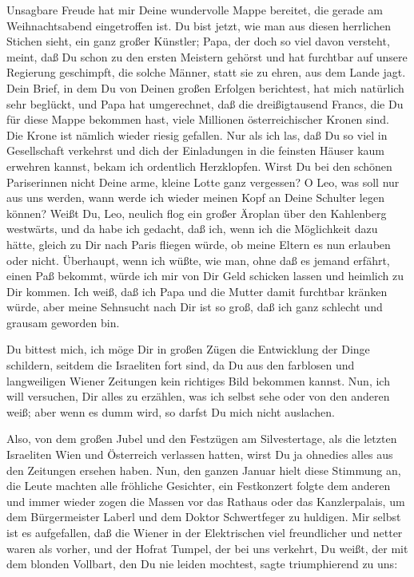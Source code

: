 Unsagbare Freude hat mir Deine wundervolle Mappe bereitet, die
gerade am Weihnachtsabend eingetroffen ist. Du bist jetzt, wie man
aus diesen herrlichen Stichen sieht, ein ganz großer Künstler;
Papa, der doch so viel davon versteht, meint, daß Du schon zu den
ersten Meistern gehörst und hat furchtbar auf unsere Regierung
geschimpft, die solche Männer, statt sie zu ehren, aus dem Lande
jagt.  Dein Brief, in dem Du von Deinen großen
Erfolgen berichtest, hat mich natürlich sehr beglückt, und Papa hat
umgerechnet, daß die dreißigtausend Francs, die Du für diese Mappe
bekommen hast, viele Millionen österreichischer Kronen sind. Die
Krone ist nämlich wieder riesig gefallen. Nur als ich las, daß Du
so viel in Gesellschaft verkehrst und dich der Einladungen in die
feinsten Häuser kaum erwehren kannst, bekam ich ordentlich
Herzklopfen. Wirst Du bei den schönen Pariserinnen nicht Deine
arme, kleine Lotte ganz vergessen? O Leo, was soll nur aus uns
werden, wann werde ich wieder meinen Kopf an Deine Schulter legen
können? Weißt Du, Leo, neulich flog ein großer Äroplan über den
Kahlenberg westwärts, und da habe ich gedacht, daß ich, wenn ich
die Möglichkeit dazu hätte, gleich zu Dir nach Paris fliegen würde,
ob meine Eltern es nun erlauben oder nicht. Überhaupt, wenn ich
wüßte, wie man, ohne daß es jemand erfährt, einen Paß bekommt,
würde ich mir von Dir Geld schicken lassen und heimlich zu Dir
kommen. Ich weiß, daß ich Papa und die Mutter damit furchtbar
kränken würde, aber meine Sehnsucht nach Dir ist so groß, daß ich
ganz schlecht und grausam geworden bin.

Du bittest mich, ich möge Dir in großen Zügen die Entwicklung der
Dinge schildern, seitdem die Israeliten fort sind, da Du aus den
farblosen und langweiligen Wiener Zeitungen kein richtiges Bild
bekommen kannst. Nun, ich will versuchen, Dir alles zu erzählen,
was ich selbst sehe oder von den anderen weiß; aber wenn es dumm
wird, so darfst Du mich nicht auslachen.

Also, von dem großen Jubel und den Festzügen am
Silvestertage, als die letzten Israeliten Wien und Österreich
verlassen hatten, wirst Du ja ohnedies alles aus den Zeitungen
ersehen haben. Nun, den ganzen Januar hielt diese Stimmung an, die
Leute machten alle fröhliche Gesichter, ein Festkonzert folgte dem
anderen und immer wieder zogen die Massen vor das Rathaus oder das
Kanzlerpalais, um dem Bürgermeister Laberl und dem Doktor
Schwertfeger zu huldigen. Mir selbst ist es aufgefallen, daß die
Wiener in der Elektrischen viel freundlicher und netter waren als
vorher, und der Hofrat Tumpel, der bei uns verkehrt, Du weißt, der
mit dem blonden Vollbart, den Du nie leiden mochtest, sagte
triumphierend zu uns:

